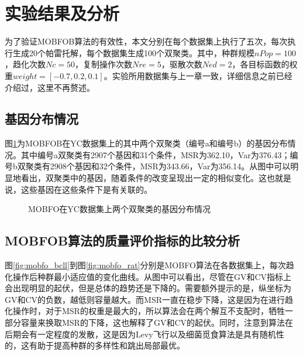 \section{实验结果及分析}
为了验证MOBFOB算法的有效性，本文分别在每个数据集上执行了五次，每次执行生成20个帕雷托解，每个数据集生成100个双聚类。其中，种群规模$nPop=100$，趋化次数$Nc=50$，复制操作次数$Nre=5$，驱散次数$Ned=2$，各目标函数的权重$weight = [-0.7, 0.2, 0.1]$。实验所用数据集与上一章一致，详细信息之前已经介绍过，这里不再赘述。

    \subsection{基因分布情况}
    图\ref{fig:mobfo_bics}为MOBFOB在YC数据集上的其中两个双聚类（编号a和编号b）的基因分布情况。其中编号a双聚类有2907个基因和31个条件，MSR为362.10，Var为376.43；编号b双聚类有2908个基因和32个条件，MSR为343.66，Var为356.14。从图中可以明显地看出，双聚类中的基因，随着条件的改变呈现出一定的相似变化。这也就是说，这些基因在这些条件下是有关联的。
    \begin{figure}[htbp]
    \setlength{\subfigcapskip}{-1bp}
    \centering
    \begin{minipage}{.9\textwidth}
    \centering
    \subfigure{}\addtocounter{subfigure}{-2}
    \hspace{.1em}
    \subfigure{}\addtocounter{subfigure}{-2}
    \end{minipage}
    \vspace{0.2em}
    \caption{MOBFO在YC数据集上两个双聚类的基因分布情况}
    \label{fig:mobfo_bics}
    \end{figure}

    \subsection{MOBFOB算法的质量评价指标的比较分析}
    图\ref{fig:mobfo_bcll}到图\ref{fig:mobfo_rat}分别是MOBFO算法在各数据集上，每次趋化操作后种群最小适应值的变化曲线。从图中可以看出，尽管在GV和CV指标上会出现明显的起伏，但是总体的趋势还是下降的。需要额外提示的是，纵坐标为GV和CV的负数，越低则容量越大。而MSR一直在稳步下降，这是因为在进行趋化操作时，对于MSR的权重是最大的，所以算法会在两个解互不支配时，牺牲一部分容量来换取MSR的下降，这也解释了GV和CV的起伏。同时，注意到算法在后期会有一定程度的发散，这是因为Levy飞行以及细菌觅食算法是具有随机性的，这有助于提高种群的多样性和跳出局部最优。

